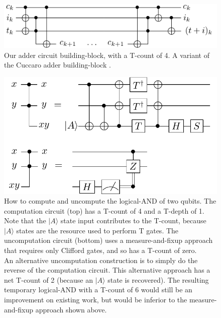 \documentclass[twocolumn]{revtex4-1}
\begin{document}
\begin{figure}[H]
  \includegraphics[width=\linewidth]{adder-building-block.pdf}
  \caption{
	Our adder circuit building-block, with a T-count of 4.
	A variant of the Cuccaro adder building-block \citep{Cuccaro2004}.
  }
  \label{fig:adder-building-block}
\end{figure}

\begin{figure}[H]
  \includegraphics[width=\linewidth]{temporary-logical-and.pdf}
  \caption{
	How to compute and uncompute the logical-AND of two qubits.
	The computation circuit (top) has a T-count of 4 and a T-depth of 1.
	Note that the $|A\rangle$ state input contributes to the T-count, because $|A\rangle$ states are the resource used to perform T gates.
	The uncomputation circuit (bottom) uses a measure-and-fixup approach \cite{Jones2013} that requires only Clifford gates, and so has a T-count of zero.
    \\
    An alternative uncomputation construction is to simply do the reverse of the computation circuit.
    This alternative approach has a net T-count of 2 (because an $|A\rangle$ state is recovered).
    The resulting temporary logical-AND with a T-count of 6 would still be an improvement on existing work, but would be inferior to the measure-and-fixup approach shown above.
  }
  \label{fig:temporary-logical-AND}
\end{figure}
\end{document}
